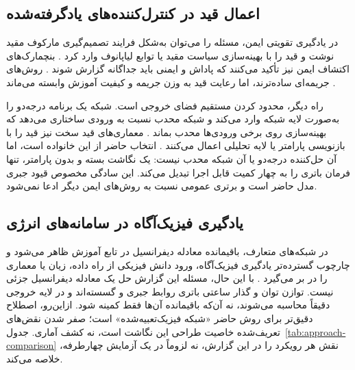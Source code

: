 \subsection{اعمال قید در کنترل‌کننده‌های یادگرفته‌شده}
در یادگیری تقویتی ایمن، مسئله را می‌توان به‌شکل فرایند تصمیم‌گیری مارکوف مقید نوشت  و قید را با بهینه‌سازی سیاست مقید یا توابع لیاپانوف وارد کرد . بنچمارک‌های اکتشاف ایمن نیز تأکید می‌کنند که پاداش و ایمنی باید جداگانه گزارش شوند . روش‌های جریمه‌ای ساده‌ترند، اما رعایت قید به وزن جریمه و کیفیت آموزش وابسته می‌ماند .

راه دیگر، محدود کردن مستقیم فضای خروجی است. شبکه  یک برنامه درجه‌دو را به‌صورت لایه شبکه وارد می‌کند  و شبکه محدب نسبت به ورودی ساختاری می‌دهد که بهینه‌سازی روی برخی ورودی‌ها محدب بماند . معماری‌های قید سخت نیز قید را با بازنویسی پارامتر یا لایه تحلیلی اعمال می‌کنند . انتخاب حاضر از این خانواده است، اما آن حل‌کننده درجه‌دو یا آن شبکه محدب نیست: یک نگاشت بسته و بدون پارامتر، تنها فرمان باتری را به چهار کمیت قابل اجرا تبدیل می‌کند. این سادگی مخصوص قیود جبری مدل حاضر است و برتری عمومی نسبت به روش‌های ایمن دیگر ادعا نمی‌شود.

\subsection{یادگیری فیزیک‌آگاه در سامانه‌های انرژی}
در شبکه‌های  متعارف، باقیمانده معادله دیفرانسیل در تابع آموزش ظاهر می‌شود  و چارچوب گسترده‌تر یادگیری فیزیک‌آگاه، ورود دانش فیزیکی از راه داده، زیان یا معماری را در بر می‌گیرد . با این حال، مسئله این گزارش حل یک معادله دیفرانسیل جزئی نیست. توازن توان و گذار ساعتی باتری روابط جبری و گسسته‌اند و در لایه خروجی دقیقاً محاسبه می‌شوند، نه آن‌که باقیمانده آن‌ها فقط کمینه شود. ازاین‌رو، اصطلاح دقیق‌تر برای روش حاضر «شبکه فیزیک‌تعبیه‌شده» است؛ صفر شدن نقض‌های تعریف‌شده خاصیت طراحی این نگاشت است، نه کشف آماری. جدول~\ref{tab:approach-comparison} نقش هر رویکرد را در این گزارش، نه لزوماً در یک آزمایش چهارطرفه، خلاصه می‌کند.

